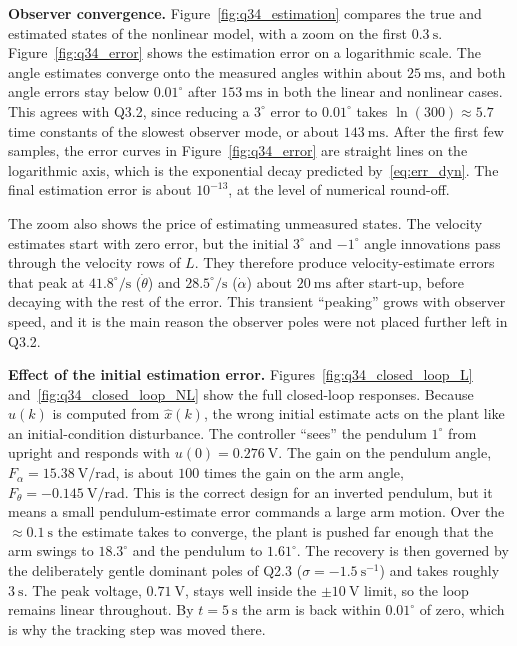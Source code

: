 \documentclass[11pt,a4paper]{article}
\begin{document}
\textbf{Observer convergence.}
Figure~\ref{fig:q34_estimation} compares the true and estimated states of the
nonlinear model, with a zoom on the first $0.3~\mathrm s$.
Figure~\ref{fig:q34_error} shows the estimation error on a logarithmic scale.
The angle estimates converge onto the measured angles within about
$25~\mathrm{ms}$, and both angle errors stay below $0.01^\circ$ after
$153~\mathrm{ms}$ in both the linear and nonlinear cases. This agrees with
Q3.2, since reducing a $3^\circ$ error to $0.01^\circ$ takes
$\ln(300)\approx5.7$ time constants of the slowest observer mode, or about
$143~\mathrm{ms}$. After the first few samples, the error curves in
Figure~\ref{fig:q34_error} are straight lines on the logarithmic axis, which is
the exponential decay predicted by~\eqref{eq:err_dyn}. The final estimation
error is about $10^{-13}$, at the level of numerical round-off.

The zoom also shows the price of estimating unmeasured states. The velocity
estimates start with zero error, but the initial $3^\circ$ and $-1^\circ$
angle innovations pass through the velocity rows of $L$. They therefore
produce velocity-estimate errors that peak at $41.8^\circ/\mathrm s$
($\dot\theta$) and $28.5^\circ/\mathrm s$ ($\dot\alpha$) about
$20~\mathrm{ms}$ after start-up, before decaying with the rest of the error.
This transient ``peaking'' grows with observer speed, and it is the main reason
the observer poles were not placed further left in Q3.2.

\textbf{Effect of the initial estimation error.}
Figures~\ref{fig:q34_closed_loop_L} and~\ref{fig:q34_closed_loop_NL} show the
full closed-loop responses. Because $u(k)$ is computed from $\hat x(k)$, the
wrong initial estimate acts on the plant like an initial-condition disturbance.
The controller ``sees'' the pendulum $1^\circ$ from upright and responds with
$u(0)=0.276~\mathrm V$. The gain on the pendulum angle,
$F_\alpha=15.38~\mathrm{V/rad}$, is about $100$ times the gain on the arm
angle, $F_\theta=-0.145~\mathrm{V/rad}$. This is the correct design for an
inverted pendulum, but it means a small pendulum-estimate error commands a
large arm motion. Over the $\approx0.1~\mathrm s$ the estimate takes to
converge, the plant is pushed far enough that the arm swings to $18.3^\circ$
and the pendulum to $1.61^\circ$. The recovery is then governed by the
deliberately gentle dominant poles of Q2.3 ($\sigma=-1.5~\mathrm{s^{-1}}$) and
takes roughly $3~\mathrm s$. The peak voltage, $0.71~\mathrm V$, stays well
inside the $\pm10~\mathrm V$ limit, so the loop remains linear throughout.
By $t=5~\mathrm s$ the arm is back within $0.01^\circ$ of zero, which is why
the tracking step was moved there.
\end{document}
